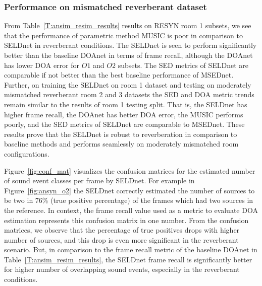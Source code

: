 \documentclass[journal]{IEEEtran}
\begin{document}
\subsubsection{Performance on mismatched reverberant dataset}
From Table~\ref{T:ansim_resim_results} results on RESYN room 1 subsets, we see that the performance of parametric method MUSIC is poor in comparison to SELDnet in reverberant conditions. The SELDnet is seen to perform significantly better than the baseline DOAnet in terms of frame recall, although the DOAnet has lower DOA error for $O1$ and $O2$ subsets. The SED metrics of SELDnet are comparable if not better than the best baseline performance of MSEDnet. Further, on training the SELDnet on room 1 dataset and testing on moderately mismatched reverberant room 2 and 3 datasets the SED and DOA metric trends remain similar to the results of room 1 testing split. That is, the SELDnet has higher frame recall, the DOAnet has better DOA error, the MUSIC performs poorly, and the SED metrics of SELDnet are comparable to MSEDnet. These results prove that the SELDnet is robust to reverberation in comparison to baseline methods and performs seamlessly on moderately mismatched room configurations.


Figure~\ref{fig:conf_mat} visualizes the confusion matrices for the estimated number of sound event classes per frame by SELDnet. For example in Figure~\ref{fig:ansyn_o2} the SELDnet correctly estimated the number of sources to be two in 76\% (true positive percentage) of the frames which had two sources in the reference. In context, the frame recall value used as a metric to evaluate DOA estimation represents this confusion matrix in one number. From the confusion matrices, we observe that the percentage of true positives drops with higher number of sources, and this drop is even more significant in the reverberant scenario. But, in comparison to the frame recall metric of the baseline DOAnet in Table~\ref{T:ansim_resim_results}, the SELDnet frame recall is significantly better for higher number of overlapping sound events, especially in the reverberant conditions.
\end{document}
